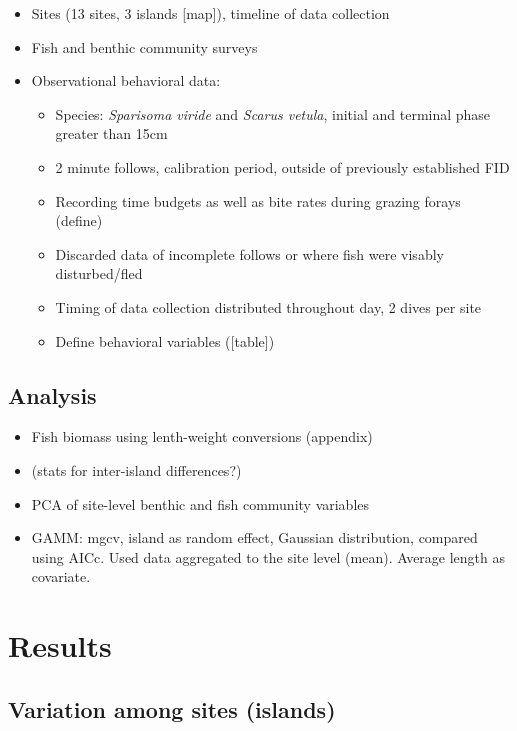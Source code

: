 \documentclass[]{article}
\providecommand{\tightlist}{%
  \setlength{\itemsep}{0pt}\setlength{\parskip}{0pt}}
\begin{document}
\begin{itemize}
\tightlist
\item
  Sites (13 sites, 3 islands {[}map{]}), timeline of data collection
\item
  Fish and benthic community surveys
\item
  Observational behavioral data:

  \begin{itemize}
  \tightlist
  \item
    Species: \emph{Sparisoma viride} and \emph{Scarus vetula}, initial
    and terminal phase greater than 15cm
  \item
    2 minute follows, calibration period, outside of previously
    established FID
  \item
    Recording time budgets as well as bite rates during grazing forays
    (define)
  \item
    Discarded data of incomplete follows or where fish were visably
    disturbed/fled
  \item
    Timing of data collection distributed throughout day, 2 dives per
    site
  \item
    Define behavioral variables ({[}table{]})
  \end{itemize}
\end{itemize}

\subsection{Analysis}\label{analysis}

\begin{itemize}
\tightlist
\item
  Fish biomass using lenth-weight conversions (appendix)
\item
  (stats for inter-island differences?)
\item
  PCA of site-level benthic and fish community variables
\item
  GAMM: mgcv, island as random effect, Gaussian distribution, compared
  using AICc. Used data aggregated to the site level (mean). Average
  length as covariate.
\end{itemize}

\section{Results}\label{results}

\subsection{Variation among sites
(islands)}\label{variation-among-sites-islands}
\end{document}
